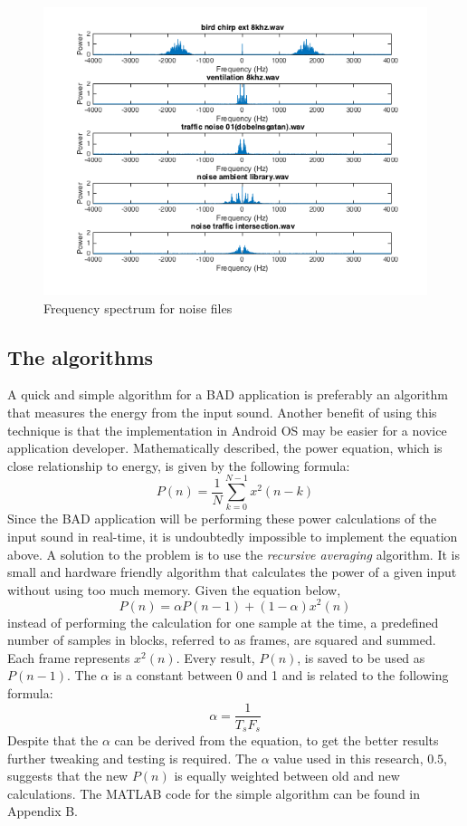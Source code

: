\begin{figure}[H]
  \centering
  \includegraphics[width=1\textwidth]{sections/freq_spec_noise_2.png}
  \caption{Frequency spectrum for noise files}
  \label{fig:noise_spec}
\end{figure}

\subsection{The algorithms}
A quick and simple algorithm for a BAD application is preferably an algorithm that measures the 
energy from the input sound. Another benefit of using this technique is that the implementation in Android 
OS may be easier for a novice application developer.
Mathematically described, the power equation, which is close relationship to energy, is given by the following formula: 
\[
P(n) = \frac{1}{N} \sum\limits_{k=0}^{N-1} x^2(n-k)
\]
Since the BAD application will be performing these power calculations of the input sound in 
real-time, it is undoubtedly impossible to implement the equation above. A solution to the problem is to use the 
\emph{recursive averaging} algorithm. It is small and hardware friendly algorithm that calculates the power of a given input
without using too much memory. Given the equation below,
\[
P(n) = \alpha P(n-1)+(1-\alpha)x^2(n)
\]
instead of performing the calculation for one sample at the time, a predefined number of samples in blocks, referred to as frames,
are squared and summed. Each frame represents $x^2(n)$. Every result, $P(n)$, is saved to be used as $P(n-1)$. 
The $\alpha$ is a constant between 0 and 1 and is related to the following formula:
\[
\alpha = \frac{1}{T_{s}F_{s}}
\]
Despite that the $\alpha$ can be derived from the equation, to get the better results further tweaking and testing is required.
The $\alpha$ value used in this research, $0.5$, suggests that the new $P(n)$ is equally weighted between old and new calculations.
The MATLAB code for the simple algorithm can be found in Appendix B.

